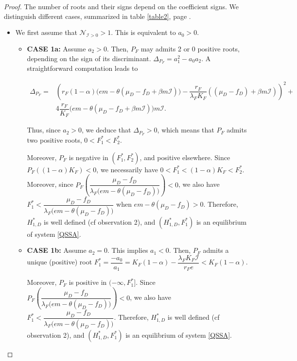 \documentclass{article}
\newcommand{\lfw}{\lambda_{F}}
\newcommand{\lfw}{\lambda_{F}}
\newcommand{\cI}{\mathcal{I}}
\begin{document}
\begin{proof}
The number of roots and their signs depend on the coefficient signs. We distinguish different cases, summarized in table \ref{table2}, page \pageref{table2}.

\begin{itemize}
\item We first assume that $\mathcal{N}_{\cI > 0} > 1$. This is equivalent to $a_0>0$.

\begin{itemize}


\medskip

\item \textbf{CASE 1a:} Assume $a_2>0$. Then, $P_F$ may admits 2 or 0 positive roots, depending on the sign of its discriminant. $\Delta_{P_F}=a_1^2-a_0a_2$. A straightforward computation leads to

$$
\begin{array}{ll}
\Delta_{P_F}=&\left(r_{F}(1-\alpha)\Big(em-\theta(\mu_{D}-f_{D}+\beta m\mathcal{I})\Big)-\dfrac{r_{F}}{\lambda_{F}K_{F}}\left((\mu_{D}-f_{D})+\beta m\mathcal{I}\right)\right)^{2}+\\
&4\dfrac{r_{F}}{K_{F}}\Big(em-\theta(\mu_{D}-f_{D}+\beta m\mathcal{I})\Big)m\mathcal{I}.
\end{array}
$$

Thus, since $a_2>0$, we deduce that $\Delta_{P_F}>0$,
which means that $P_F$ admits two positive roots, $0<F_1^* < F_2^*$. 

Moreover, $P_F$ is negative in $(F_1^*, F_2^*)$, and positive elsewhere. Since $P_F((1-\alpha) K_F) < 0$, we necessarily have $0 < F_1^* < (1-\alpha) K_F < F_2^*$.
Moreover, since $P_F\left(\dfrac{\mu_D - f_D}{\lfw \Big(e m - \theta (\mu_D - f_D)\Big)} \right) < 0$, we also have $F_1^* < \dfrac{\mu_D - f_D}{\lfw \Big(e m - \theta (\mu_D - f_D)\Big)}$ when $e m - \theta (\mu_D - f_D) > 0$. Therefore, $H_{1,D}^*$ is well defined (cf observation 2), and $(H_{1,D}^*,F_1^*)$ is an equilibrium of system \eqref{QSSA}.

\item \textbf{CASE 1b:} Assume $a_2 = 0$. This implies $a_1 < 0$. Then, $P_F$ admits a unique (positive) root $F_1^* = \dfrac{-a_0}{a_1} = K_F(1-\alpha) - \dfrac{\lfw K_F \cI}{r_F e} < K_F(1-\alpha)$.

Moreover, $P_F$ is positive in $(-\infty, F_1^*]$. Since $P_F\left(\dfrac{\mu_D - f_D}{\lfw \Big(e m - \theta (\mu_D - f_D)\Big)} \right) < 0$, we also have $F_1^* < \dfrac{\mu_D - f_D}{\lfw \Big(e m - \theta (\mu_D - f_D)\Big)}$. Therefore, $H_{1,D}^*$ is well defined (cf observation 2), and $(H_{1,D}^*,F_1^*)$ is an equilibrium of system \eqref{QSSA}.


\end{itemize}
\end{itemize}
\end{proof}
\end{document}

